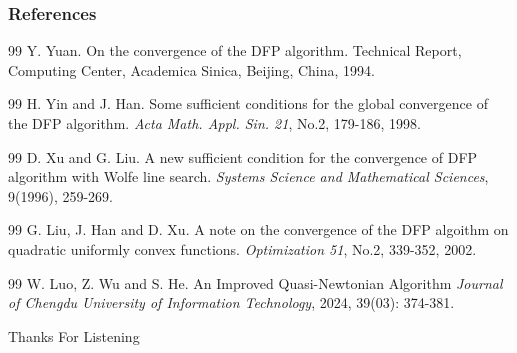 \documentclass{beamer}
\begin{document}
\begin{frame}

\frametitle{References}
\footnotesize{

\begin{thebibliography}{99}
 Y. Yuan.
\newblock    On the convergence of the DFP algorithm.
\newblock    Technical Report, Computing Center, Academica Sinica, Beijing, China, 1994.
\end{thebibliography}

\begin{thebibliography}{99}
 H. Yin and J. Han.
\newblock    Some sufficient conditions for the global convergence of the DFP algorithm.
\newblock   \textit{Acta Math. Appl. Sin. 21}, No.2, 179-186, 1998.
\end{thebibliography}

\begin{thebibliography}{99}
 D. Xu and G. Liu.
\newblock    A new sufficient condition for the convergence of DFP algorithm with Wolfe line search.
\newblock    \textit{Systems Science and Mathematical Sciences}, 9(1996), 259-269.    
\end{thebibliography}

\begin{thebibliography}{99}
 G. Liu, J. Han and D. Xu.
\newblock    A note on the convergence of the DFP algoithm on quadratic uniformly convex functions.
\newblock    \textit{Optimization 51}, No.2, 339-352, 2002.    
\end{thebibliography}

\begin{thebibliography}{99}
 W. Luo, Z. Wu and S. He.
\newblock    An Improved Quasi-Newtonian Algorithm
\newblock    \textit{Journal of Chengdu University of Information Technology}, 2024, 39(03): 374-381. 
\end{thebibliography}
}

\end{frame}


\begin{frame}
\Huge{\centerline{Thanks For Listening}}
\end{frame}

\end{document}

